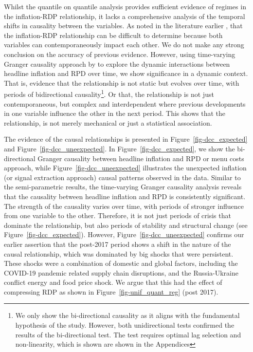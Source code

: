 \documentclass[
  letterpaper,
  DIV=11,
  numbers=noendperiod]{scrartcl}
\begin{document}
Whilst the quantile on quantile analysis provides sufficient evidence of
regimes in the inflation-RDP relationship, it lacks a comprehensive
analysis of the temporal shifts in causality between the variables. As
noted in the literature earlier \citep[for
example][]{grier1996, parsley1996}, that the inflation-RDP relationship
can be difficult to determine because both variables can
contemporaneously impact each other. We do not make any strong
conclusion on the accuracy of previous evidence. However, using
time-varying Granger causality approach by \citet{lu2014} to explore the
dynamic interactions between headline inflation and RPD over time, we
show significance in a dynamic context. That is, evidence that the
relationship is not static but evolves over time, with periods of
bidirectional causality\footnote{We only show the bi-directional
  causality as it aligns with the fundamental hypothesis of the study.
  However, both unidirectional tests confirmed the results of the
  bi-directional test. The test requires optimal lag selection and
  non-linearity, which is shown are shown in the Appendices}. Or that,
the relationship is not just contemporaneous, but complex and
interdependent where previous developments in one variable influence the
other in the next period. This shows that the relationship, is not
merely mechanical or just a statistical association.

The evidence of the causal relationships is presented in
Figure~\ref{fig-dcc_expected} and Figure~\ref{fig-dcc_uneexpected}. In
Figure~\ref{fig-dcc_expected}, we show the bi-directional Granger
causality between headline inflation and RPD or menu costs approach,
while Figure~\ref{fig-dcc_uneexpected} illustrates the unexpected
inflation (or signal extraction approach) causal patterns observed in
the data. Similar to the semi-parametric results, the time-varying
Granger causality analysis reveals that the causality between headline
inflation and RPD is consistently significant. The strength of the
causality varies over time, with periods of stronger influence from one
variable to the other. Therefore, it is not just periods of crisis that
dominate the relationship, but also periods of stability and structural
change (see Figure~\ref{fig-dcc_expected}). However,
Figure~\ref{fig-dcc_uneexpected} confirms our earlier assertion that the
post-2017 period shows a shift in the nature of the causal relationship,
which was dominated by big shocks that were persistent. These shocks
were a combination of domestic and global factors, including the
COVID-19 pandemic related supply chain disruptions, and the
Russia-Ukraine conflict energy and food price shock. We argue that this
had the effect of compressing RDP as shown in
Figure~\ref{fig-unif_quant_reg} (post 2017).
\end{document}
